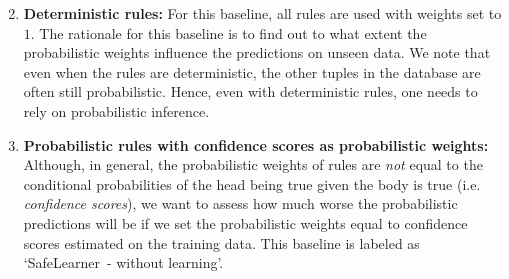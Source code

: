 \documentclass[akbc,twoside,11pt]{article}
\newcommand{\algorithmname}{SafeLearner\xspace}
\begin{document}
\begin{enumerate}
    \setcounter{enumi}{1}
    \item {\bf Deterministic rules:} For this baseline, all rules are used with weights set to $1$. The rationale for this baseline is to find out to what extent the probabilistic weights influence the predictions on unseen data. We note that even when the rules are deterministic, the other tuples in the database are often still probabilistic. Hence, even with deterministic rules, one needs to rely on probabilistic inference. %
    \item {\bf Probabilistic rules with confidence scores as probabilistic weights:} Although, in general, the probabilistic weights of rules are {\em not} equal to the conditional probabilities of the head being true given the body is true (i.e. {\em confidence scores}), we want to assess how much worse the probabilistic predictions will be if we set the probabilistic weights equal to confidence scores estimated on the training data. This baseline is labeled as `\algorithmname\ - without learning'.
\end{enumerate}




\end{document}
